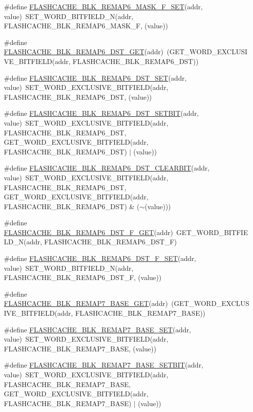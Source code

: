 \begin{DoxyCompactItemize}
\item 
\#define \hyperlink{a00549_af349658839eb911ea8f43a96c0ba76ca}{FLASHCACHE\_\-BLK\_\-REMAP6\_\-MASK\_\-F\_\-SET}(addr, value)~SET\_\-WORD\_\-BITFIELD\_\-N(addr, FLASHCACHE\_\-BLK\_\-REMAP6\_\-MASK\_\-F, (value))
\item 
\#define \hyperlink{a00549_a04c9f28b8df6b8347d91d4f9f69a45a5}{FLASHCACHE\_\-BLK\_\-REMAP6\_\-DST\_\-GET}(addr)~(GET\_\-WORD\_\-EXCLUSIVE\_\-BITFIELD(addr, FLASHCACHE\_\-BLK\_\-REMAP6\_\-DST))
\item 
\#define \hyperlink{a00549_acff75b321e5ed232168f13920786bb40}{FLASHCACHE\_\-BLK\_\-REMAP6\_\-DST\_\-SET}(addr, value)~SET\_\-WORD\_\-EXCLUSIVE\_\-BITFIELD(addr, FLASHCACHE\_\-BLK\_\-REMAP6\_\-DST, (value))
\item 
\#define \hyperlink{a00549_a4d554af85ed153eeac4381950cd718fd}{FLASHCACHE\_\-BLK\_\-REMAP6\_\-DST\_\-SETBIT}(addr, value)~SET\_\-WORD\_\-EXCLUSIVE\_\-BITFIELD(addr, FLASHCACHE\_\-BLK\_\-REMAP6\_\-DST, GET\_\-WORD\_\-EXCLUSIVE\_\-BITFIELD(addr, FLASHCACHE\_\-BLK\_\-REMAP6\_\-DST) $|$ (value))
\item 
\#define \hyperlink{a00549_ae8582920dcaf751cae148c7b23eb077c}{FLASHCACHE\_\-BLK\_\-REMAP6\_\-DST\_\-CLEARBIT}(addr, value)~SET\_\-WORD\_\-EXCLUSIVE\_\-BITFIELD(addr, FLASHCACHE\_\-BLK\_\-REMAP6\_\-DST, GET\_\-WORD\_\-EXCLUSIVE\_\-BITFIELD(addr, FLASHCACHE\_\-BLK\_\-REMAP6\_\-DST) \& ($\sim$(value)))
\item 
\#define \hyperlink{a00549_a7e3287fbccc7c19f1ba8bd55d6ba2d47}{FLASHCACHE\_\-BLK\_\-REMAP6\_\-DST\_\-F\_\-GET}(addr)~GET\_\-WORD\_\-BITFIELD\_\-N(addr, FLASHCACHE\_\-BLK\_\-REMAP6\_\-DST\_\-F)
\item 
\#define \hyperlink{a00549_a6dc7d47f59e716f1e1211a4b792669a9}{FLASHCACHE\_\-BLK\_\-REMAP6\_\-DST\_\-F\_\-SET}(addr, value)~SET\_\-WORD\_\-BITFIELD\_\-N(addr, FLASHCACHE\_\-BLK\_\-REMAP6\_\-DST\_\-F, (value))
\item 
\#define \hyperlink{a00549_ac2de0cd184e0bee011b7e908cca8b73f}{FLASHCACHE\_\-BLK\_\-REMAP7\_\-BASE\_\-GET}(addr)~(GET\_\-WORD\_\-EXCLUSIVE\_\-BITFIELD(addr, FLASHCACHE\_\-BLK\_\-REMAP7\_\-BASE))
\item 
\#define \hyperlink{a00549_a332bc5ebeae0a523ee0bebc025981f10}{FLASHCACHE\_\-BLK\_\-REMAP7\_\-BASE\_\-SET}(addr, value)~SET\_\-WORD\_\-EXCLUSIVE\_\-BITFIELD(addr, FLASHCACHE\_\-BLK\_\-REMAP7\_\-BASE, (value))
\item 
\#define \hyperlink{a00549_ad1a758db82eca6389190967cd8f0c4fb}{FLASHCACHE\_\-BLK\_\-REMAP7\_\-BASE\_\-SETBIT}(addr, value)~SET\_\-WORD\_\-EXCLUSIVE\_\-BITFIELD(addr, FLASHCACHE\_\-BLK\_\-REMAP7\_\-BASE, GET\_\-WORD\_\-EXCLUSIVE\_\-BITFIELD(addr, FLASHCACHE\_\-BLK\_\-REMAP7\_\-BASE) $|$ (value))

\end{DoxyCompactItemize}
